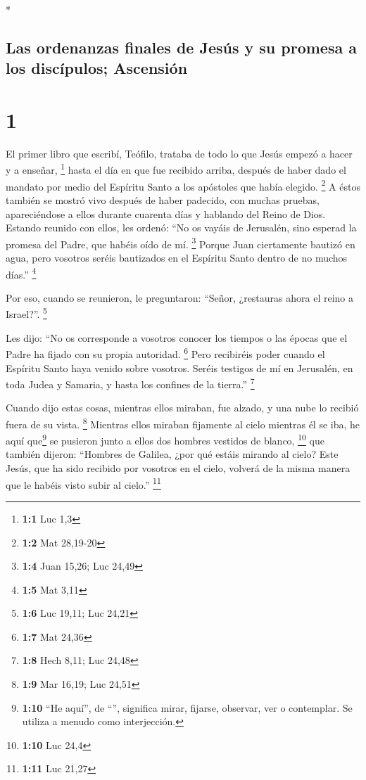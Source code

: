 \begin{paracol}{2} \switchcolumn[0]*

\hypertarget{las-ordenanzas-finales-de-jesuxfas-y-su-promesa-a-los-discuxedpulos-ascensiuxf3n}{%
\subsection{Las ordenanzas finales de Jesús y su promesa a los
discípulos;
Ascensión}\label{las-ordenanzas-finales-de-jesuxfas-y-su-promesa-a-los-discuxedpulos-ascensiuxf3n}}

\hypertarget{section}{%
\section{1}\label{section}}

 El primer libro que escribí, Teófilo, trataba de todo lo
que Jesús empezó a hacer y a enseñar, \footnote{\textbf{1:1} Luc 1,3}
 hasta el día en que fue recibido arriba, después de haber
dado el mandato por medio del Espíritu Santo a los apóstoles que había
elegido. \footnote{\textbf{1:2} Mat 28,19-20}  A éstos
también se mostró vivo después de haber padecido, con muchas pruebas,
apareciéndose a ellos durante cuarenta días y hablando del Reino de
Dios.  Estando reunido con ellos, les ordenó: ``No os
vayáis de Jerusalén, sino esperad la promesa del Padre, que habéis oído
de mí. \footnote{\textbf{1:4} Juan 15,26; Luc 24,49} 
Porque Juan ciertamente bautizó en agua, pero vosotros seréis bautizados
en el Espíritu Santo dentro de no muchos días.'' \footnote{\textbf{1:5}
  Mat 3,11}

 Por eso, cuando se reunieron, le preguntaron: ``Señor,
¿restauras ahora el reino a Israel?''. \footnote{\textbf{1:6} Luc 19,11;
  Luc 24,21}

 Les dijo: ``No os corresponde a vosotros conocer los
tiempos o las épocas que el Padre ha fijado con su propia autoridad.
\footnote{\textbf{1:7} Mat 24,36}  Pero recibiréis poder
cuando el Espíritu Santo haya venido sobre vosotros. Seréis testigos de
mí en Jerusalén, en toda Judea y Samaria, y hasta los confines de la
tierra.'' \footnote{\textbf{1:8} Hech 8,11; Luc 24,48}

 Cuando dijo estas cosas, mientras ellos miraban, fue
alzado, y una nube lo recibió fuera de su vista. \footnote{\textbf{1:9}
  Mar 16,19; Luc 24,51}  Mientras ellos miraban fijamente
al cielo mientras él se iba, he aquí que\footnote{\textbf{1:10} ``He
  aquí'', de ``'', significa mirar, fijarse, observar, ver o
  contemplar. Se utiliza a menudo como interjección.} se pusieron junto
a ellos dos hombres vestidos de blanco, \footnote{\textbf{1:10} Luc 24,4}
 que también dijeron: ``Hombres de Galilea, ¿por qué
estáis mirando al cielo? Este Jesús, que ha sido recibido por vosotros
en el cielo, volverá de la misma manera que le habéis visto subir al
cielo.'' \footnote{\textbf{1:11} Luc 21,27}


\end{paracol}
